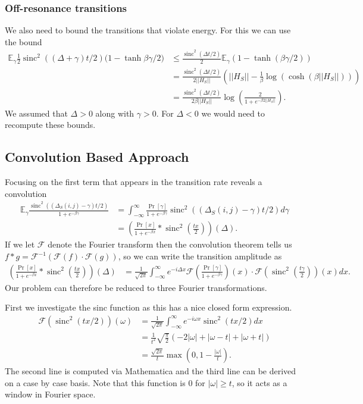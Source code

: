 \documentclass[
 amsmath,amssymb,
 aps,
onecolumn, 
nofootinbib]{revtex4-2}
\newcommand{\abs}[1]{\left| #1 \right|}
\newcommand{\norm}[1]{\left|\left| #1 \right|\right|}
\newcommand{\EE}{\mathbb{E}}
\DeclareMathOperator{\sinc}{sinc}
\begin{document}
\subsubsection{Off-resonance transitions} 
We also need to bound the transitions that violate energy. For this we can use the bound
\begin{align}
    \EE_\gamma \frac{1}{2} \sinc^2((\Delta + \gamma) t/ 2) (1- \tanh{\beta \gamma /2)} & \le \frac{\sinc^2(\Delta t /2)}{2} \EE_\gamma (1 - \tanh(\beta \gamma /2 )) \\
    &=\frac{\sinc^2(\Delta t /2)}{2 \norm{H_S}} (\norm{H_S} - \frac{1}{\beta} \log( \cosh(\beta \norm{H_S})) )\\
    &=\frac{\sinc^2(\Delta t / 2)}{2 \beta \norm{H_S}} \log \left( \frac{2}{1 + e^{-\beta 2 \norm{H_S}}}\right).
\end{align}
We assumed that $\Delta >0$ along with $\gamma > 0$. For $\Delta < 0$ we would need to recompute these bounds. 

\subsection{Convolution Based Approach}
Focusing on the first term that appears in the transition rate reveals a convolution
\begin{align}
    \EE_\gamma \frac{\sinc^2 ((\Delta_S(i,j) - \gamma) t/ 2)}{1 + e^{-\beta \gamma}} &= \int_{- \infty}^{\infty} \frac{\Pr[\gamma]}{1 + e^{-\beta \gamma}} \sinc^2 ((\Delta_S(i,j) - \gamma) t/ 2) d\gamma \\
    &= \left(\frac{\Pr[x]}{1 + e^{-\beta x}} * \sinc^2\left(\frac{t x }{2} \right) \right) (\Delta).
\end{align}
If we let $\mathcal{F}$ denote the Fourier transform then the convolution theorem tells us $f* g = \mathcal{F}^{-1} (\mathcal{F}(f) \cdot \mathcal{F}(g))$, so we can write the transition amplitude as
\begin{align}
    \left(\frac{\Pr[x]}{1 + e^{-\beta x}} * \sinc^2\left(\frac{t x }{2} \right) \right) (\Delta) &= \frac{1}{\sqrt{2 \pi}} \int_{-\infty}^{\infty} e^{- i \Delta x} \mathcal{F}\left(\frac{\Pr[\gamma]}{1 + e^{-\beta \gamma}} \right)(x) \cdot \mathcal{F} \left(\sinc^2 \left(\frac{t \gamma }{2} \right)\right)(x) dx.
\end{align}
Our problem can therefore be reduced to three Fourier transformations. 

First we investigate the sinc function as this has a nice closed form expression. 
\begin{align}
    \mathcal{F}(\sinc^2(t x / 2) )(\omega) &= \frac{1}{\sqrt{2 \pi}} \int_{-\infty}^{\infty} e^{-i \omega x} \sinc^2(tx /2 ) dx \\
    &= \frac{1}{t^2} \sqrt{\frac{\pi}{2}} \left(- 2 \abs{\omega} + \abs{\omega - t} + \abs{\omega + t}\right)\\
    &= \frac{\sqrt{2 \pi}}{t} \max\left(0,1 - \frac{\abs{\omega}}{t} \right).
\end{align}
The second line is computed via Mathematica and the third line can be derived on a case by case basis. Note that this function is 0 for $\abs{\omega} \ge t$, so it acts as a window in Fourier space. 
\end{document}
